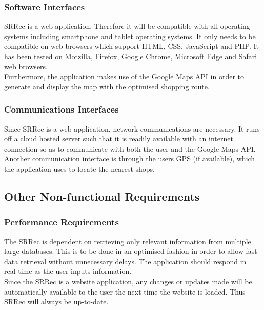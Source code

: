 \documentclass[10pt, a4paper, onecolumn]{scrartcl}
\begin{document}
		\subsubsection{Software Interfaces}
		
			SRRec is a web application. Therefore it will be compatible with all operating systems including smartphone and tablet operating systems. It only needs to be compatible on web browsers which support HTML, CSS, JavaScript and PHP. It has been tested on Motzilla, Firefox, Google Chrome, Microsoft Edge and Safari web browsers. \\
			
			Furthermore, the application makes use of the Google Maps API in order to generate and display the map with the optimised shopping route. 
		
		\subsubsection{Communications Interfaces}
		
			Since SRRec is a web application, network communications are necessary. It runs off a cloud hosted server such that it is readily available with an internet connection so as to communicate with both the user and the Google Maps API. Another communication interface is through the users GPS (if available), which the application uses to locate the nearest shops.
	
	\subsection{Other Non-functional Requirements}
	
		\subsubsection{Performance Requirements}
		
			The SRRec is dependent on retrieving only relevant information from multiple large databases. This is to be done in an optimised fashion in order to allow fast data retrieval without unnecessary delays. The application should respond in real-time as the user inputs information.\\
		
			Since the SRRec is a website application, any changes or updates made will be automatically available to the user the next time the website is loaded. Thus SRRec will always be up-to-date.\\
		
\end{document}
